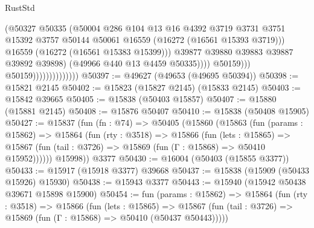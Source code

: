 \begin{lexlean}{RustStd}
\begin{coremodule}
                                              (@50327
                                                @50335
                                                (@50004
                                                  @286
                                                  @104
                                                  @13
                                                  @16
                                                  @4392
                                                  @3719
                                                  @3731
                                                  @3751
                                                  @15392
                                                  @3757
                                                  @50144
                                                  @50061
                                                  @16559
                                                  (@16272 (@16561 @15393 @3719)))
                                                @16559
                                                (@16272 (@16561 @15383 @15399)))
                                              @39877
                                              @39880
                                              @39883
                                              @39887
                                              @39892
                                              @39898)
                                            (@49966 @440 @13 @4459 @50335))))
                                      @50159)))
                                @50159))))))))))))))
@50397 := @49627 (@49653 (@49695 @50394))
@50398 := @15821 @2145
@50402 := @15823 (@15827 @2145) (@15833 @2145)
@50403 := @15842 @39665
@50405 := @15838 (@50403 @15857)
@50407 := @15880 (@15881 @2145)
@50408 := @15876 @50407
@50410 := @15838 (@50408 @15905)
@50427 := @15837
    (fun (fn : @74) =>
    @50405
      (@15860
        (@15863
          (fun (params : @15862) =>
          @15864
            (fun (rty : @3518) =>
            @15866
              (fun (lets : @15865) =>
              @15867 (fun (tail : @3726) => @15869 (fun (Γ : @15868) => @50410 @15952))))))
        @15998))
    @3377
@50430 := @16004 (@50403 (@15855 @3377))
@50433 := @15917 (@15918 @3377) @39668
@50437 := @15838 (@15909 (@50433 @15926) @15930)
@50438 := @15943 @3377
@50443 := @15940 (@15942 @50438 @39671 @15898 @15900)
@50454 := fun (params : @15862) =>
  @15864
    (fun (rty : @3518) =>
    @15866
      (fun (lets : @15865) =>
      @15867 (fun (tail : @3726) => @15869 (fun (Γ : @15868) => @50410 (@50437 @50443)))))

\end{coremodule}
\end{lexlean}
